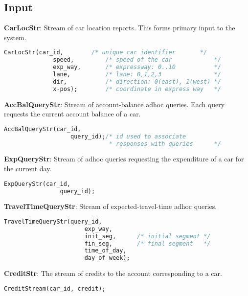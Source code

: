 \subsection{Input}
\textbf{CarLocStr}: Stream of car location reports. This forms primary input to the system. 
\begin{lstlisting}[language=SQL]
    CarLocStr(car_id,        /* unique car identifier       */
              speed,         /* speed of the car            */
              exp_way,       /* expressway: 0..10           */
              lane,          /* lane: 0,1,2,3               */ 
              dir,           /* direction: 0(east), 1(west) */
              x-pos);        /* coordinate in express way   */
\end{lstlisting}
\textbf{AccBalQueryStr}: Stream of account-balance adhoc queries. Each query requests the current account balance of a car. 
\begin{lstlisting}[language=SQL]
    AccBalQueryStr(car_id,   
                   query_id);/* id used to associate 
                              * responses with queries      */
\end{lstlisting}
\textbf{ExpQueryStr}: Stream of adhoc queries requesting the expenditure of a car for the current day. 
\begin{lstlisting}[language=SQL]
    ExpQueryStr(car_id,
                query_id);
\end{lstlisting}
\textbf{TravelTimeQueryStr}: Stream of expected-travel-time adhoc queries. 
\begin{lstlisting}[language=SQL]
    TravelTimeQueryStr(query_id,
                       exp_way,
                       init_seg,      /* initial segment */
                       fin_seg,       /* final segment   */
                       time_of_day,   
                       day_of_week);
\end{lstlisting}
\textbf{CreditStr}: The stream of credits to the account corresponding to a car. 
\begin{lstlisting}[language=SQL]                   
    CreditStream(car_id, credit);
\end{lstlisting}

